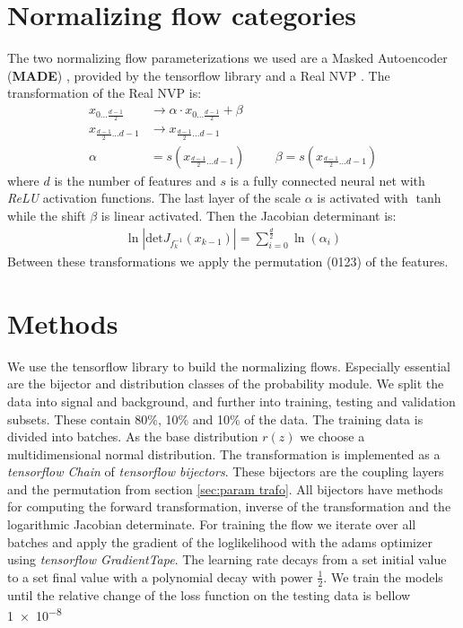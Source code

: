 \documentclass[%
 reprint,
 amsmath,amssymb,
 aps,
]{revtex4-2}
\begin{document}
\section{Normalizing flow categories}
The two normalizing flow parameterizations we used are a Masked Autoencoder (\textbf{MADE}) , provided by the tensorflow library and a Real NVP . 
The transformation of the Real NVP is: 
\begin{align*}
	x_{0...\frac{d-1}{2}} &\rightarrow \alpha \cdot x_{0...\frac{d-1}{2}} + \beta\\
	x_{\frac{d-1}{2}...d-1} &\rightarrow x_{\frac{d-1}{2}...d-1} \\
	\alpha &= s(x_{\frac{d-1}{2}...d-1}) \hspace{1cm} \beta = s(x_{\frac{d-1}{2}...d-1})
\end{align*}
where $d$ is the number of features and $s$ is a fully connected neural net with \textit{ReLU} activation functions. The last layer of the scale $\alpha$ is activated with $\tanh$ while the shift $\beta$ is linear activated.
Then the Jacobian determinant is:
\begin{align*}
	\ln\left|\text{det}J_{f_{k}^{-1}}(x_{k-1})\right| = \sum_{i=0}^{\frac{d}{2}} \ln(\alpha_i)
\end{align*}
Between these transformations we apply the permutation (0123) of the features.




\section{Methods}
We use the tensorflow library to build the normalizing flows. Especially essential are the bijector and distribution classes of the probability module.
We split the data into signal and background, and further into training, testing and validation subsets.
These contain 80\%, 10\% and 10\% of the data. The training data is divided into batches.
As the base distribution $r(z)$ we choose a multidimensional normal distribution.
The transformation is implemented as a \textit{ tensorflow Chain} of \textit{ tensorflow bijectors}. These bijectors are the coupling layers and the permutation from section \ref{sec:param trafo}.  
All bijectors have methods for computing the forward transformation, inverse of the transformation and the logarithmic Jacobian determinate.
For training the flow we iterate over all batches and apply the gradient of the loglikelihood with the adams optimizer using \textit{tensorflow GradientTape}. The learning rate decays from a set initial value to a set final value with a polynomial decay with power $\frac{1}{2}$.
We train the models until the relative change of the loss function on the testing data is bellow \SI{1e-8}.
\end{document}
